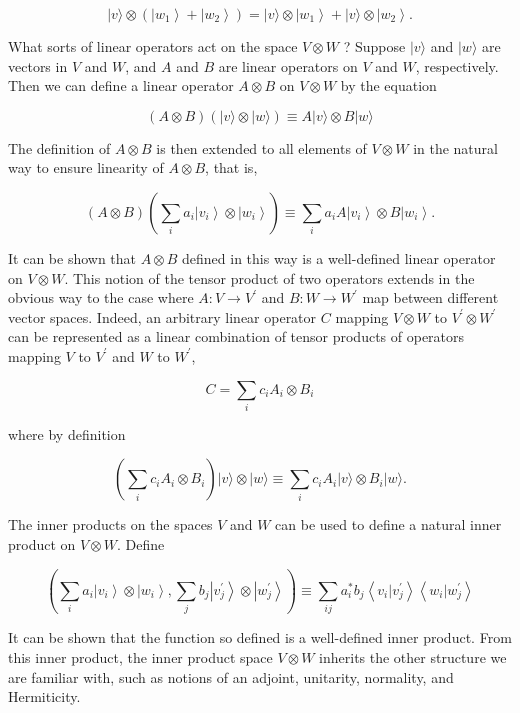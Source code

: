 \documentclass[
	11pt, %
	fleqn, %
	a4paper, %
]{LegrandOrangeBook}
\begin{document}
$$
|v\rangle \otimes\left(\left|w_{1}\right\rangle+\left|w_{2}\right\rangle\right)=|v\rangle \otimes\left|w_{1}\right\rangle+|v\rangle \otimes\left|w_{2}\right\rangle .
$$

What sorts of linear operators act on the space $V \otimes W$ ? Suppose $|v\rangle$ and $|w\rangle$ are vectors in $V$ and $W$, and $A$ and $B$ are linear operators on $V$ and $W$, respectively. Then we can define a linear operator $A \otimes B$ on $V \otimes W$ by the equation

$$
(A \otimes B)(|v\rangle \otimes|w\rangle) \equiv A|v\rangle \otimes B|w\rangle
$$

The definition of $A \otimes B$ is then extended to all elements of $V \otimes W$ in the natural way to ensure linearity of $A \otimes B$, that is,

$$
(A \otimes B)\left(\sum_{i} a_{i}\left|v_{i}\right\rangle \otimes\left|w_{i}\right\rangle\right) \equiv \sum_{i} a_{i} A\left|v_{i}\right\rangle \otimes B\left|w_{i}\right\rangle .
$$

It can be shown that $A \otimes B$ defined in this way is a well-defined linear operator on $V \otimes W$. This notion of the tensor product of two operators extends in the obvious way to the case where $A: V \rightarrow V^{\prime}$ and $B: W \rightarrow W^{\prime}$ map between different vector spaces. Indeed, an arbitrary linear operator $C$ mapping $V \otimes W$ to $V^{\prime} \otimes W^{\prime}$ can be represented as a linear combination of tensor products of operators mapping $V$ to $V^{\prime}$ and $W$ to $W^{\prime}$,

$$
C=\sum_{i} c_{i} A_{i} \otimes B_{i}
$$

where by definition

$$
\left(\sum_{i} c_{i} A_{i} \otimes B_{i}\right)|v\rangle \otimes|w\rangle \equiv \sum_{i} c_{i} A_{i}|v\rangle \otimes B_{i}|w\rangle .
$$

The inner products on the spaces $V$ and $W$ can be used to define a natural inner product on $V \otimes W$. Define

$$
\left(\sum_{i} a_{i}\left|v_{i}\right\rangle \otimes\left|w_{i}\right\rangle, \sum_{j} b_{j}\left|v_{j}^{\prime}\right\rangle \otimes\left|w_{j}^{\prime}\right\rangle\right) \equiv \sum_{i j} a_{i}^{*} b_{j}\left\langle v_{i} | v_{j}^{\prime}\right\rangle\left\langle w_{i} | w_{j}^{\prime}\right\rangle
$$

It can be shown that the function so defined is a well-defined inner product. From this inner product, the inner product space $V \otimes W$ inherits the other structure we are familiar with, such as notions of an adjoint, unitarity, normality, and Hermiticity.
\end{document}
